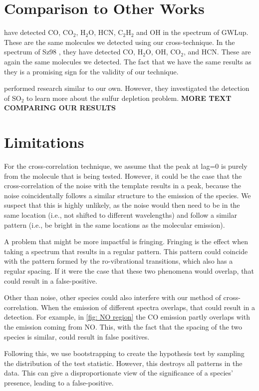 \documentclass[oneside, single, authoryear, semicolon, 12pt]{lion-msc}
\newcommand{\4}{$_4$}
\newcommand{\3}{$_3$}
\newcommand{\2}{$_2$}
\begin{document}
\section{Comparison to Other Works}
\cite{Grant_2023} have detected CO, CO\2, H\2O, HCN, C\2H\2 and OH in the spectrum of GWLup. These are the same molecules we detected using our cross-technique. In the spectrum of Sz98 \cite{Gasman_2023}, they have detected CO, H\2O, OH, CO\2, and HCN. These are again the same molecules we detected. The fact that we have the same results as they is a promising sign for the validity of our technique. 

\cite{groningenthesis} performed research similar to our own. However, they investigated the detection of SO\2 to learn more about the sulfur depletion problem. \textbf{MORE TEXT COMPARING OUR RESULTS}

\section{Limitations}
For the cross-correlation technique, we assume that the peak at lag=0 is purely from the molecule that is being tested. However, it could be the case that the cross-correlation of the noise with the template results in a peak, because the noise coincidentally follows a similar structure to the emission of the species. We suspect that this is highly unlikely, as the noise would then need to be in the same location (i.e., not shifted to different wavelengths) and follow a similar pattern (i.e., be bright in the same locations as the molecular emission). 

A problem that might be more impactful is fringing. Fringing is the effect when taking a spectrum that results in a regular pattern. This pattern could coincide with the pattern formed by the ro-vibrational transitions, which also has a regular spacing. If it were the case that these two phenomena would overlap, that could result in a false-positive.

Other than noise, other species could also interfere with our method of cross-correlation. When the emission of different spectra overlaps, that could result in a detection. For example, in \autoref{fig: NO region} the CO emission partly overlaps with the emission coming from NO. This, with the fact that the spacing of the two species is similar, could result in false positives. 

Following this, we use bootstrapping to create the hypothesis test by sampling the distribution of the test statistic. However, this destroys all patterns in the data. This can give a disproportionate view of the significance of a species' presence, leading to a false-positive.
\end{document}
